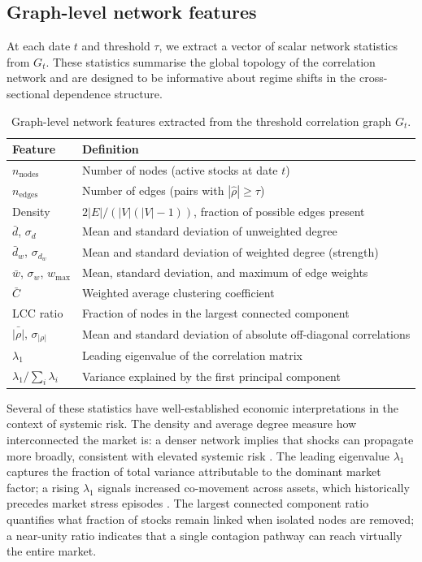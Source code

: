 \documentclass{article}
\begin{document}
\subsection{Graph-level network features}
\label{sec:graph_features}

At each date $t$ and threshold $\tau$, we extract a vector of scalar network statistics from $G_t$. These statistics summarise the global topology of the correlation network and are designed to be informative about regime shifts in the cross-sectional dependence structure.

\begin{table}[H]
\centering
\caption{Graph-level network features extracted from the threshold correlation graph $G_t$.}
\label{tab:net_features}
\begin{tabular}{lp{9.5cm}}
\toprule
\textbf{Feature} & \textbf{Definition} \\
\midrule
$n_{\text{nodes}}$ & Number of nodes (active stocks at date $t$) \\
$n_{\text{edges}}$ & Number of edges (pairs with $|\hat\rho| \geq \tau$) \\
Density & $2 |E| / (|V|(|V|-1))$, fraction of possible edges present \\
$\bar{d}$, $\sigma_d$ & Mean and standard deviation of unweighted degree \\
$\bar{d}_w$, $\sigma_{d_w}$ & Mean and standard deviation of weighted degree (strength) \\
$\bar{w}$, $\sigma_w$, $w_{\max}$ & Mean, standard deviation, and maximum of edge weights \\
$\bar{C}$ & Weighted average clustering coefficient \\
LCC ratio & Fraction of nodes in the largest connected component \\
$\bar{|\rho|}$, $\sigma_{|\rho|}$ & Mean and standard deviation of absolute off-diagonal correlations \\
$\lambda_1$ & Leading eigenvalue of the correlation matrix \\
$\lambda_1 / \sum_i \lambda_i$ & Variance explained by the first principal component \\
\bottomrule
\end{tabular}
\end{table}

Several of these statistics have well-established economic interpretations in the context of systemic risk. The density and average degree measure how interconnected the market is: a denser network implies that shocks can propagate more broadly, consistent with elevated systemic risk \cite{billio2012}. The leading eigenvalue $\lambda_1$ captures the fraction of total variance attributable to the dominant market factor; a rising $\lambda_1$ signals increased co-movement across assets, which historically precedes market stress episodes \cite{laloux1999}. The largest connected component ratio quantifies what fraction of stocks remain linked when isolated nodes are removed; a near-unity ratio indicates that a single contagion pathway can reach virtually the entire market.
\end{document}

